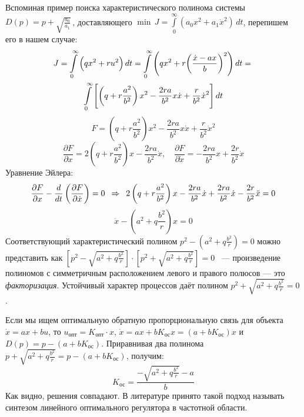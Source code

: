 \documentclass[preprint,russian,a5paper,10pt,twoside,mediummath]{ncc}
\begin{document}
Вспоминая пример поиска характеристического полинома системы $D\left( p \right)=p+\sqrt{\frac{{{a}_{0}}}{{{a}_{1}}}}\,$, доставляющего $\min \, J=\int\limits_{0}^{\infty }{\left( a_0{{x}^{2}}+a_1{{{\dot{x}}}^{2}} \right)} \, dt$, перепишем его в нашем случае:
\begin{multline*}
J = \int\limits_{0}^{\infty }{\Bigl( q{{x}^{2}}+r{{u}^{2}} \Bigr)} \, dt = \int\limits_{0}^{\infty }{\left( q{{x}^{2}}+r{{\left( \frac{\dot{x}-ax}{b} \right)}^{2}} \right)} \, dt ={} \\*
	\int\limits_{0}^{\infty }{ \Biggl[ \left( q+r\frac{{{a}^{2}}}{{{b}^{2}}} \right){{x}^{2}}-\frac{2ra}{{{b}^{2}}}x\dot{x}+\frac{r}{{{b}^{2}}}{{{\dot{x}}}^{2}} \Biggr] } \, dt
\end{multline*}
\[ F=\left( q+r\frac{{{a}^{2}}}{{{b}^{2}}} \right){{x}^{2}}-\frac{2ra}{{{b}^{2}}}x\dot{x}+\frac{r}{{{b}^{2}}}{{\dot{x}}^{2}} \]
\[ \frac{\partial F}{\partial x}=2\left( q+r\frac{{{a}^{2}}}{{{b}^{2}}} \right)x-\frac{2ra}{{{b}^{2}}}\dot{x}, \quad
	\frac{\partial F}{\partial \dot{x}}=-\frac{2ra}{{{b}^{2}}}x+\frac{2r}{{{b}^{2}}}\dot{x} \]
Уравнение Эйлера:
\[ \frac{\partial F}{\partial x}-\frac{d}{dt}\left( \frac{\partial F}{\partial \dot{x}} \right)=0 \enskip \Rightarrow \enskip 2\left( q + r \frac{a^2}{b^2} \right) x - \frac{2ra}{b^2} \dot{x} + \frac{2ra}{b^2} \dot{x} - \frac{2r}{b^2} \ddot{x} = 0 \]
\[ \ddot{x} - \left( a^2 + q \frac{b^2}{r} \right) x = 0 \]
Соответствующий характеристический полином \vspace{1ex} ${{p}^{2}}-\left( {{a}^{2}}+q\frac{{{b}^{2}}}{r} \right)=0$ можно представить \vspace{1ex} как $\left[ p^2 - \sqrt{a^2 + q \frac{b^2}{r}} \right] \cdot \left[ p^2 + \sqrt{a^2 + q \frac{b^2}{r}} \right] = 0 $ \  --- произведение полиномов с симметричным расположением левого и правого полюсов --- это \textit{факторизация}. Устойчивый \vspace{.5ex} характер процессов даёт полином $ p^2 + \sqrt{a^2 + q \frac{b^2}{r}} = 0 $.

\vspace{1ex}
Если мы ищем оптимальную обратную пропорциональную связь для объекта $\dot{x}=ax+bu$, то $ u_\textit{опт} = K_\textit{опт} \cdot x $, $\dot{x}=ax+b{{K}_\textit{ос}}x=\left( a+b{{K}_\textit{ос}} \right)x$ и $D\left( p \right)=p-\left( a+b{{K}_\textit{ос}} \right)$. Приравнивая \vspace{1ex} два полинома $p+\sqrt{{{a}^{2}}+q\frac{{{b}^{2}}}{r}}=p-\left( a+b{{K}_\textit{ос}} \right)$, получим:
\[ K_\textit{ос} = \frac{-\sqrt{{{a}^{2}}+q\frac{{{b}^{2}}}{r}}-a}{b} \]
Как видно, решения совпадают. В литературе принято такой подход называть синтезом линейного оптимального регулятора в частотной области.
\end{document}
